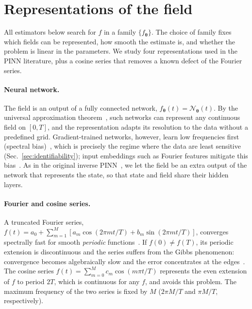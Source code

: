 \documentclass[aps,pra,twocolumn,superscriptaddress,10pt,longbibliography,floatfix]{revtex4-2}
\begin{document}
\section{Representations of the field}\label{sec:representations}

All estimators below search for $f$ in a family $\{f_{\bm\theta}\}$. The choice of family fixes which
fields can be represented, how smooth the estimate is, and whether the problem is linear in the
parameters. We study four representations used in the PINN literature, plus a cosine series that
removes a known defect of the Fourier series.

\paragraph{Neural network.}
The field is an output of a fully connected network, $f_{\bm\theta}(t)=\mathcal N_{\bm\theta}(t)$. By
the universal approximation theorem~\cite{cybenko1989,hornik1989}, such networks can represent any
continuous field on $[0,T]$, and the representation adapts its resolution to the data without a
predefined grid. Gradient-trained networks, however, learn low frequencies first (spectral
bias)~\cite{rahaman2019spectral}, which is precisely the regime where the data are least sensitive
(Sec.~\ref{sec:identifiability}); input embeddings such as Fourier features mitigate this
bias~\cite{tancik2020fourier}. As in the original inverse PINN~\cite{raissi2019pinn}, we let the field
be an extra output of the network that represents the state, so that state and field share their hidden
layers.

\paragraph{Fourier and cosine series.}
A truncated Fourier series,
$f(t)=a_0+\sum_{m=1}^{M}[a_m\cos(2\pi mt/T)+b_m\sin(2\pi mt/T)]$, converges spectrally fast for smooth
\emph{periodic} functions~\cite{boyd2001spectral}. If $f(0)\neq f(T)$, its periodic extension is
discontinuous and the series suffers from the Gibbs phenomenon: convergence becomes algebraically slow
and the error concentrates at the edges~\cite{boyd2001spectral}. The cosine series
$f(t)=\sum_{m=0}^{M}c_m\cos(m\pi t/T)$ represents the even extension of $f$ to period $2T$, which is
continuous for any $f$, and avoids this problem. The maximum frequency of the two series is fixed by $M$
($2\pi M/T$ and $\pi M/T$, respectively).
\end{document}
